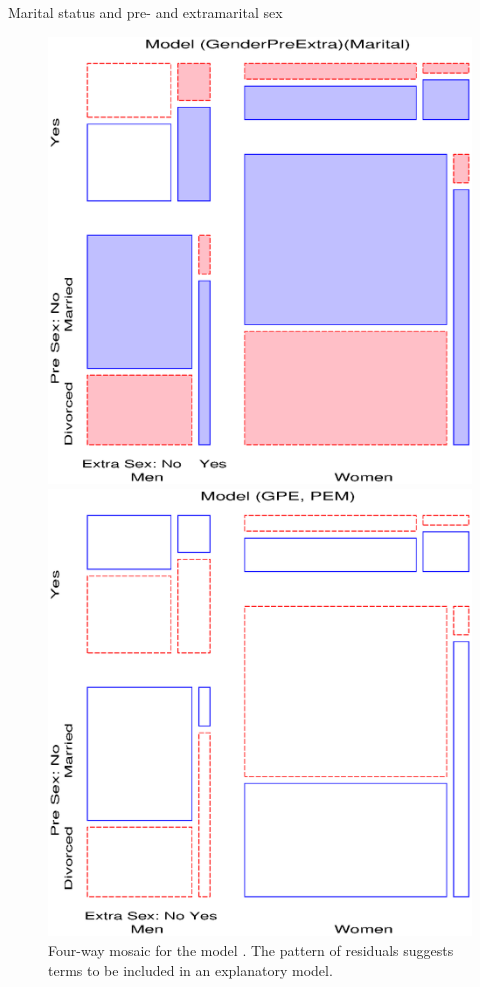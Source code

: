 \begin{Example}[marital1]{Marital status and pre- and extramarital sex}
\begin{figure}[htb]
 \begin{minipage}[t]{.49\linewidth}
  \centering
  \includegraphics[width=1\linewidth]{ch4/fig/mosaic53}
  \caption[Four-way mosaic for the model  ]{Four-way mosaic for the model  .  The pattern of residuals suggests terms to be included
in an explanatory model.}%
  \label{fig:mosaic53}
 \end{minipage}%
 \hfill
 \begin{minipage}[t]{.49\linewidth}
  \centering
  \includegraphics[width=1\linewidth]{ch4/fig/mosaic54}

\end{minipage}
\end{figure}
\end{Example}
